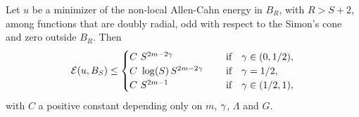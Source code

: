 \begin{theorem}
\label{Th:EnergyEstimate} Let $u$ be a minimizer of the non-local Allen-Cahn energy in $B_{R}$,
with $R>S+2$, among functions that are doubly radial, odd with respect to the Simon's cone and zero
outside $B_R$. Then
$$ \mathcal{E} (u,B_S) \leq \begin{cases}
C \ S^{2m-2\gamma}\ \ \ \ &\textrm{if } \ \ \gamma\in(0,1/2),\\
C\ \log(S)\,S^{2m-2\gamma}\ \ \ \ &\textrm{if } \ \ \gamma=1/2,\\
C \ S^{2m-1}\ \ \ \ &\textrm{if } \ \ \gamma\in(1/2,1),\\
\end{cases} $$
with $C$ a positive constant depending only on $m$, $\gamma$, $\Lambda$ and $G$.
\end{theorem}

